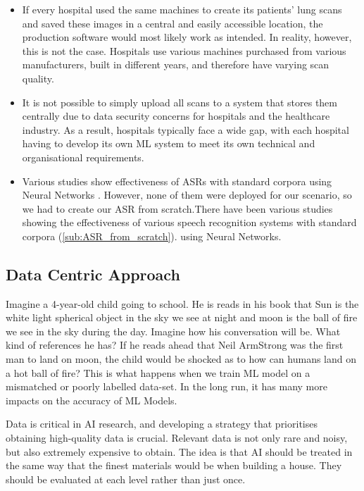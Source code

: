 \begin{enumerate}
\begin{itemize}
        \item If every hospital used the same machines to create its patients' lung scans and saved these images in a central and easily accessible location, the production software would most likely work as intended. In reality, however, this is not the case. Hospitals use various machines purchased from various manufacturers, built in different years, and therefore have varying scan quality.
        \item It is not possible to simply upload all scans to a system that stores them centrally due to data security concerns for hospitals and the healthcare industry. As a result, hospitals typically face a wide gap, with each hospital having to develop its own ML system to meet its own technical and organisational requirements.
        \item Various studies show effectiveness of ASRs with standard corpora using Neural Networks \cite{georgescu_performance_2021}. However, none of them were deployed for our scenario, so we had to create our ASR from scratch.There have been various studies showing the effectiveness of various speech recognition systems with standard corpora (\ref{sub:ASR_from_scratch}). using Neural Networks. 
    \end{itemize}
   
\end{enumerate}

\subsection{Data Centric Approach}
\label{sub:data_centric_approach}

Imagine a 4-year-old child going to school. He is reads in his book that Sun is the white light spherical object in the sky we see at night and moon is the ball of fire we see in the sky during the day. Imagine how his conversation will be. What kind of references he has? If he reads ahead that Neil ArmStrong was the first man to land on moon, the child would be shocked as to how can humans land on a hot ball of fire? This is what happens when we train ML model on a mismatched or poorly labelled data-set. In the long run, it has many more impacts on the accuracy of ML Models. \cite{fan_impact_2021}

Data is critical in AI research, and developing a strategy that prioritises obtaining high-quality data is crucial. Relevant data is not only rare and noisy, but also extremely expensive to obtain. The idea is that AI should be treated in the same way that the finest materials would be when building a house. They should be evaluated at each level rather than just once.

